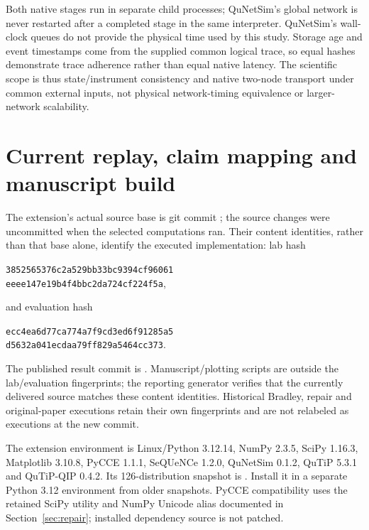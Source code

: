 Both native stages run in separate child processes; QuNetSim's global network is never restarted after a completed stage in the same interpreter. QuNetSim's wall-clock queues do not provide the physical time used by this study. Storage age and event timestamps come from the supplied common logical trace, so equal hashes demonstrate trace adherence rather than equal native latency. The scientific scope is thus state/instrument consistency and native two-node transport under common external inputs, not physical network-timing equivalence or larger-network scalability.

\clearpage
\section{Current replay, claim mapping and manuscript build}
The extension's actual source base is git commit ; the source changes were uncommitted when the selected computations ran. Their content identities, rather than that base alone, identify the executed implementation: lab hash
\par\noindent\begin{minipage}{\linewidth}\centering\small\texttt{3852565376c2a529bb33bc9394cf96061}\\\texttt{eeee147e19b4f4bbc2da724cf224f5a},\end{minipage}\par
and evaluation hash
\par\noindent\begin{minipage}{\linewidth}\centering\small\texttt{ecc4ea6d77ca774a7f9cd3ed6f91285a5}\\\texttt{d5632a041ecdaa79ff829a5464cc373}.\end{minipage}\par
The published result commit is \href{https://github.com/VesterlundCoder/memory-discover-lab/commit/935817372520428e88398235ad58ee3d9817e2ba}{}. Manuscript/plotting scripts are outside the lab/evaluation fingerprints; the reporting generator verifies that the currently delivered source matches these content identities. Historical Bradley, repair and original-paper executions retain their own fingerprints and are not relabeled as executions at the new commit.

The extension environment is Linux/Python 3.12.14, NumPy 2.3.5, SciPy 1.16.3, Matplotlib 3.10.8, PyCCE 1.1.1, SeQUeNCe 1.2.0, QuNetSim 0.1.2, QuTiP 5.3.1 and QuTiP-QIP 0.4.2. Its 126-distribution snapshot is . Install it in a separate Python 3.12 environment from older snapshots. PyCCE compatibility uses the retained SciPy utility and NumPy Unicode alias documented in Section~\ref{sec:repair}; installed dependency source is not patched.

